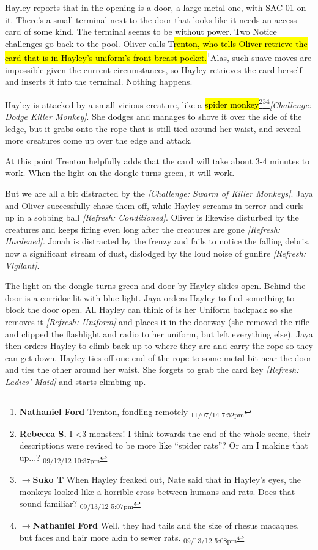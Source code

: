 Hayley reports that in the opening is a door, a large metal one, with SAC-01 on it.  There's a small terminal next to the door that looks like it needs an access card of some kind.  The terminal seems to be without power.  Two Notice challenges go back to the pool.  Oliver calls T\hl{renton, who tells Oliver retrieve the card that is in Hayley's uniform's front breast pocket.}\footnote{\textbf{Nathaniel Ford }Trenton, fondling remotely \textsubscript{11/07/14 7:52pm}}Alas, such suave moves are impossible given the current circumstances, so Hayley retrieves the card herself and inserts it into the terminal.  Nothing happens.



Hayley is attacked by a small vicious creature, like a \hl{spider monkey}\footnote{\textbf{Rebecca S. }I \textless 3 monsters!  I think towards the end of the whole scene, their descriptions were revised to be more like ``spider rats''?  Or am I making that up...? \textsubscript{09/12/12 10:37pm}}\footnote{$\rightarrow$\textbf{Suko T }When Hayley freaked out, Nate said that in Hayley's eyes, the monkeys looked like a horrible cross between humans and rats.  Does that sound familiar? \textsubscript{09/13/12 5:07pm}}\footnote{$\rightarrow$\textbf{Nathaniel Ford }Well, they had tails and the size of rhesus macaques, but faces and hair more akin to sewer rats. \textsubscript{09/13/12 5:08pm}}\textit{{[}Challenge: Dodge Killer Monkey{]}}.  She dodges and manages to shove it over the side of the ledge, but it grabs onto the rope that is still tied around her waist, and several more creatures come up over the edge and attack.



At this point Trenton helpfully adds that the card will take about 3-4 minutes to work.  When the light on the dongle turns green, it will work.



But we are all a bit distracted by the \textit{{[}Challenge: Swarm of Killer Monkeys{]}}.  Jaya and Oliver successfully chase them off, while Hayley screams in terror and curls up in a sobbing ball \textit{{[}Refresh: Conditioned{]}}.  Oliver is likewise disturbed by the creatures and keeps firing even long after the creatures are gone \textit{{[}Refresh: Hardened{]}.}  Jonah is distracted by the frenzy and fails to notice the falling debris, now a significant stream of dust, dislodged by the loud noise of gunfire \textit{{[}Refresh: Vigilant{]}}.



The light on the dongle turns green and door by Hayley slides open.  Behind the door is a corridor lit with blue light.  Jaya orders Hayley to find something to block the door open.  All Hayley can think of is her Uniform backpack so she removes it \textit{{[}Refresh: Uniform{]}} and places it in the doorway (she removed the rifle and clipped the flashlight and radio to her uniform, but left everything else).  Jaya then orders Hayley to climb back up to where they are and carry the rope so they can get down.  Hayley ties off one end of the rope to some metal bit near the door and ties the other around her waist. She forgets to grab the card key \textit{{[}Refresh: Ladies' Maid{]} }and starts climbing up.



